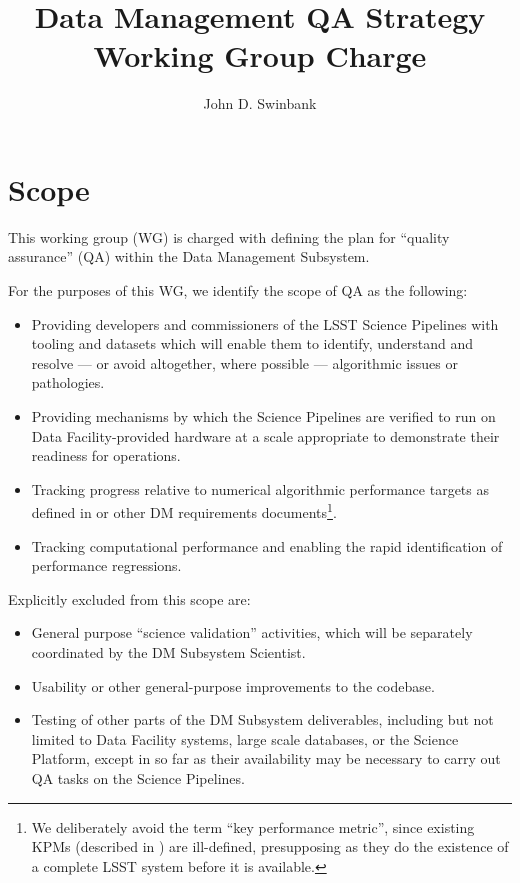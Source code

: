 \documentclass[DM,lsstdraft,toc]{lsstdoc}
\title[DM QA WG]{Data Management QA Strategy Working Group Charge}
\author{John D. Swinbank}
\begin{document}
\maketitle

\section{Scope}

This working group (WG) is charged with defining the plan for ``quality
assurance'' (QA) within the Data Management Subsystem.

For the purposes of this WG, we identify the scope of QA as the following:

\begin{itemize}

  \item{Providing developers and commissioners of the LSST Science Pipelines
  with tooling and datasets which will enable them to identify, understand and
  resolve --- or avoid altogether, where possible --- algorithmic issues or
  pathologies.}

  \item{Providing mechanisms by which the Science Pipelines are verified to
  run on Data Facility-provided hardware at a scale appropriate to demonstrate
  their readiness for operations.}

  \item{Tracking progress relative to numerical algorithmic performance
  targets as defined in  or other DM requirements
  documents\footnote{We deliberately avoid the term ``key performance
  metric'', since existing KPMs (described in ) are
  ill-defined, presupposing as they do the existence of a complete LSST
  system before it is available.}.}

  \item{Tracking computational performance and enabling the rapid
  identification of performance regressions.}

\end{itemize}

Explicitly excluded from this scope are:

\begin{itemize}

  \item{General purpose ``science validation'' activities, which will be
  separately coordinated by the DM Subsystem Scientist.}

  \item{Usability or other general-purpose improvements to the codebase.}

  \item{Testing of other parts of the DM Subsystem deliverables, including but
  not limited to Data Facility systems, large scale databases, or the Science
  Platform, except in so far as their availability may be necessary to carry
  out QA tasks on the Science Pipelines.}

\end{itemize}
\end{document}
